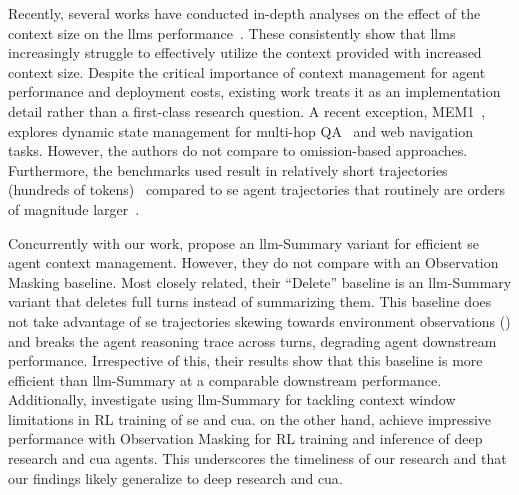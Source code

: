 \documentclass{article}
\begin{document}
Recently, several works have conducted in-depth analyses on the effect of the context size on the \acp{llm} performance~\cite{liu_lost_in_the_middle_2024,hong2025context,modarressi_nolima_2025}. These consistently show that \acp{llm} increasingly struggle to effectively utilize the context provided with increased context size. Despite the critical importance of context management for agent performance and deployment costs, existing work treats it as an implementation detail rather than a first-class research question. A recent exception, MEM1~\cite{zhou_mem1_2025}, explores dynamic state management for multi-hop QA~\cite{yang_hotpotqa_2018,naturalquestions2019kwiatkowski,jin2025search} and web navigation~\cite{yao_webshop_2023} tasks. However, the authors do not compare to omission-based approaches. Furthermore, the benchmarks used result in relatively short trajectories (hundreds of tokens)~\cite{zhou_mem1_2025} compared to \ac{se} agent trajectories that routinely are orders of magnitude larger~\cite{lindenbauer-2025-ctim}.

Concurrently with our work, \citet{xiao_improving_2025} propose an \ac{llm}-Summary variant for efficient \ac{se} agent context management. However, they do not compare with an Observation Masking baseline. Most closely related, their ``Delete'' baseline is an \ac{llm}-Summary variant that deletes full turns instead of summarizing them. This baseline does not take advantage of \ac{se} trajectories skewing towards environment observations () and breaks the agent reasoning trace across turns, degrading agent downstream performance. Irrespective of this, their results show that this baseline is more efficient than \ac{llm}-Summary at a comparable downstream performance. Additionally, \citet{lu_scaling_2025} investigate using \ac{llm}-Summary for tackling context window limitations in RL training of \ac{se} and \ac{cua}. \citet{tang_beyond_2025} on the other hand, achieve impressive performance with Observation Masking for RL training and inference of deep research and \ac{cua} agents. This underscores the timeliness of our research and that our findings likely generalize to deep research and \ac{cua}.
\end{document}
